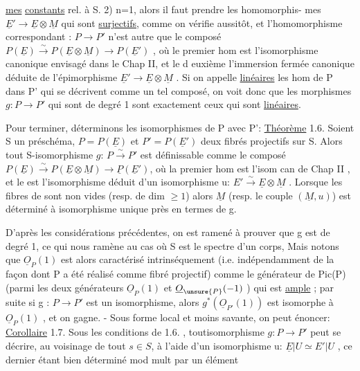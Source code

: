 
\uline{mes} \uline{constants} rel. à S. 2) n=1, alors il faut prendre les homomorphis-%
mes  $\underline{E}'\to \underline{E}\otimes\underline{M}$ qui sont \uline{surjectifs}, comme on vérifie
aussitôt, et l'homomorphisme correspondant : $P\to P'$ n'est autre que le
composé $P(\underline{E})\xrightarrow{\sim}P(\underline{E}\otimes\underline{M})\to P(\underline{E}')$ , où le premier hom est l'isomorphisme
canonique envisagé dans le Chap II, et le d euxième l'immersion fermée
canonique déduite de l'épimorphisme $\underline{E}'\to\underline{E}\otimes\underline{M}$ . Si on appelle \uline{linéaires}
les hom de P dans P' qui se décrivent comme un tel composé, on voit donc
que les morphismes $g:P\to P'$ qui sont de degré 1 sont exactement ceux qui
sont \uline{linéaires}.

Pour terminer, déterminons les isomorphismes de P avec P':
\uline{Théorème} 1.6. Soient S un préschéma, $P=P(\underline{E})$ et $P'=P(\underline{E}')$ deux fibrés
projectifs sur S. Alors tout S-isomorphisme $g$: $P\xrightarrow{\sim}P'$ est définissable
comme le composé $P(\underline{E})\xrightarrow{\sim}P(\underline{E}\otimes\underline{M})\to \underline{P}(\underline{E}')$, où la premier hom est l'isom
can de Chap II , et le  est l'isomorphisme  déduit
d'un isomorphisme u: $E'\xrightarrow{\sim}\underline{E}\otimes\underline{M}$ . Lorsque les fibres de  sont non
vides (resp. de dim $\geq 1$) alors $\underline{M}$ (resp. le couple $(\underline{M},u)$) est déterminé
à isomorphisme unique près en termes de g.

D'après les considérations précédentes, on est ramené à prouver
que g est de degré 1, ce qui nous ramène au cas où S est le spectre d'un
corps, Mais notons que $\underline{O}_P(1)$ est alors caractérisé intrinséquement (i.e.
indépendamment de la façon dont P a été réalisé comme fibré projectif)
comme le générateur de Pic(P) (parmi les deux générateurs $\underline{O}_P(1)$ et
$\underline{O}_{\unsure{P}}(-1)$ ) qui est \uline{ample} ; par suite si g : $P\to P'$ est un isomorphisme,
alors $g^{*}(\underline{O}_{P'}(1))$ est isomorphe à $\underline{O}_P(1)$ , et on gagne. - Sous forme local
et moins savante, on peut énoncer:
\uline{Corollaire} 1.7. Sous les conditions de 1.6. , toutisomorphisme $g:P\to P'$
peut se décrire, au voisinage de tout $s\in S$, à l'aide d'un isomorphisme
u: $\underline{E}|U \simeq E'|U$ , ce dernier étant bien déterminé mod mult par un élément
